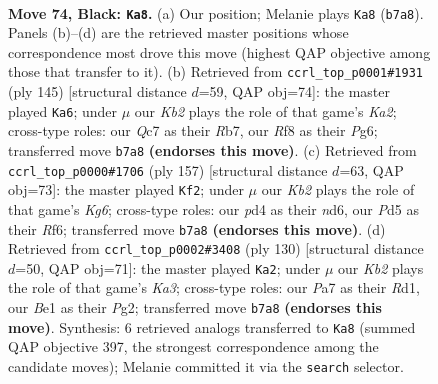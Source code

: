 \documentclass[11pt]{article}
\begin{document}
\clearpage

\begin{figure}[p]\centering
\begin{subfigure}{0.46\textwidth}\centering
\resizebox{\linewidth}{!}{%
\newchessgame
\chessboard[
  setfen={5r1r/pkq3p1/7p/1Q1p3P/3P2P1/4P3/7N/4b2K b - - 4 74},
  showmover=false,
  pgfstyle=straightmove, color=movearrow, markmove={b7-a8}
]}
\caption{}
\end{subfigure}\hfill
\begin{subfigure}{0.46\textwidth}\centering
\resizebox{\linewidth}{!}{%
\newchessgame
\chessboard[
  setfen={8/kr3p2/4p1p1/p1QpP3/P4P2/1b2P1K1/8/8 b - - 20 73},
  showmover=false,
  pgfstyle=straightmove, color=movearrow, markmove={a7-a6}
]}
\caption{}
\end{subfigure}
\\[4pt]
\begin{subfigure}{0.46\textwidth}\centering
\resizebox{\linewidth}{!}{%
\newchessgame
\chessboard[
  setfen={8/8/1p1N1r1p/3P3Q/2Pnpq2/Pp4k1/1P6/K5R1 b - - 16 79},
  showmover=false,
  pgfstyle=straightmove, color=movearrow, markmove={g3-f2}
]}
\caption{}
\end{subfigure}\hfill
\begin{subfigure}{0.46\textwidth}\centering
\resizebox{\linewidth}{!}{%
\newchessgame
\chessboard[
  setfen={8/5p1k/3Q2p1/p6p/P1P1P2P/K1q5/6P1/3R4 w - - 1 66},
  showmover=false,
  pgfstyle=straightmove, color=movearrow, markmove={a3-a2}
]}
\caption{}
\end{subfigure}
\caption{\textbf{Move 74, Black: \texttt{Ka8}.} (a) Our position; Melanie plays \texttt{Ka8} (\texttt{b7a8}). Panels (b)--(d) are the retrieved master positions whose correspondence most drove this move (highest QAP objective among those that transfer to it). (b) Retrieved from \texttt{ccrl\_top\_p0001\#1931} (ply 145) [structural distance $d$=59, QAP obj=74]: the master played \texttt{Ka6}; under $\mu$ our \emph{Kb2} plays the role of that game's \emph{Ka2}; cross-type roles: our \emph{Q}c7 as their \emph{R}b7, our \emph{R}f8 as their \emph{P}g6; transferred move \texttt{b7a8} \textbf{(endorses this move)}. (c) Retrieved from \texttt{ccrl\_top\_p0000\#1706} (ply 157) [structural distance $d$=63, QAP obj=73]: the master played \texttt{Kf2}; under $\mu$ our \emph{Kb2} plays the role of that game's \emph{Kg6}; cross-type roles: our \emph{p}d4 as their \emph{n}d6, our \emph{P}d5 as their \emph{R}f6; transferred move \texttt{b7a8} \textbf{(endorses this move)}. (d) Retrieved from \texttt{ccrl\_top\_p0002\#3408} (ply 130) [structural distance $d$=50, QAP obj=71]: the master played \texttt{Ka2}; under $\mu$ our \emph{Kb2} plays the role of that game's \emph{Ka3}; cross-type roles: our \emph{P}a7 as their \emph{R}d1, our \emph{B}e1 as their \emph{P}g2; transferred move \texttt{b7a8} \textbf{(endorses this move)}. Synthesis: 6 retrieved analogs transferred to \texttt{Ka8} (summed QAP objective 397, the strongest correspondence among the candidate moves); Melanie committed it via the \texttt{search} selector.}
\label{fig:thought-m147}
\end{figure}
\end{document}
